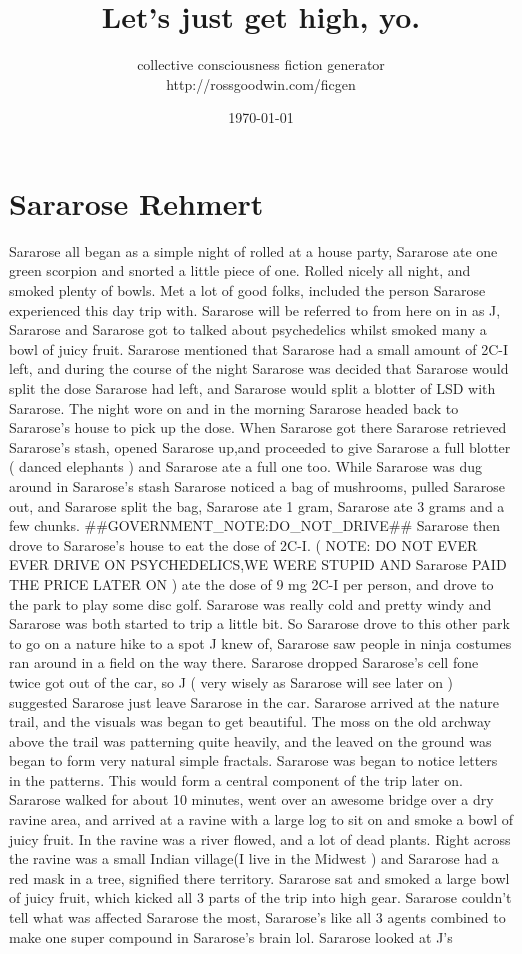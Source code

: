 \documentclass[12pt]{book}
\title{Let's just get high, yo.}
\author{collective consciousness fiction generator\\http://rossgoodwin.com/ficgen}
\date{\today}
\begin{document}
\maketitle



\chapter{Sararose Rehmert}

Sararose all began as a simple night of rolled at a house party, Sararose ate one green scorpion and snorted a little piece of one. Rolled nicely all night, and smoked plenty of bowls. Met a lot of good folks, included the person Sararose experienced this day trip with. Sararose will be referred to from here on in as J, Sararose and Sararose got to talked about psychedelics whilst smoked many a bowl of juicy fruit. Sararose mentioned that Sararose had a small amount of 2C-I left, and during the course of the night Sararose was decided that Sararose would split the dose Sararose had left, and Sararose would split a blotter of LSD with Sararose. The night wore on and in the morning Sararose headed back to Sararose's house to pick up the dose. When Sararose got there Sararose retrieved Sararose's stash, opened Sararose up,and proceeded to give Sararose a full blotter ( danced elephants ) and Sararose ate a full one too. While Sararose was dug around in Sararose's stash Sararose noticed a bag of mushrooms, pulled Sararose out, and Sararose split the bag, Sararose ate 1 gram, Sararose ate 3 grams and a few chunks. \#\#GOVERNMENT\_NOTE:DO\_NOT\_DRIVE\#\# Sararose then drove to Sararose's house to eat the dose of 2C-I. ( NOTE: DO NOT EVER EVER DRIVE ON PSYCHEDELICS,WE WERE STUPID AND Sararose PAID THE PRICE LATER ON ) ate the dose of 9 mg 2C-I per person, and drove to the park to play some disc golf. Sararose was really cold and pretty windy and Sararose was both started to trip a little bit. So Sararose drove to this other park to go on a nature hike to a spot J knew of, Sararose saw people in ninja costumes ran around in a field on the way there. Sararose dropped Sararose's cell fone twice got out of the car, so J ( very wisely as Sararose will see later on ) suggested Sararose just leave Sararose in the car. Sararose arrived at the nature trail, and the visuals was began to get beautiful. The moss on the old archway above the trail was patterning quite heavily, and the leaved on the ground was began to form very natural simple fractals. Sararose was began to notice letters in the patterns. This would form a central component of the trip later on. Sararose walked for about 10 minutes, went over an awesome bridge over a dry ravine area, and arrived at a ravine with a large log to sit on and smoke a bowl of juicy fruit. In the ravine was a river flowed, and a lot of dead plants. Right across the ravine was a small Indian village(I live in the Midwest ) and Sararose had a red mask in a tree, signified there territory. Sararose sat and smoked a large bowl of juicy fruit, which kicked all 3 parts of the trip into high gear. Sararose couldn't tell what was affected Sararose the most, Sararose's like all 3 agents combined to make one super compound in Sararose's brain lol. Sararose looked at J's 
\end{document}
